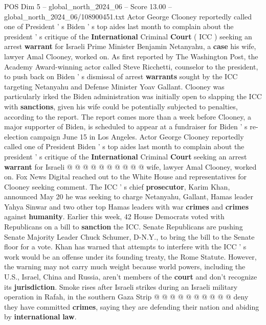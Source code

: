 \begin{textsample}{POS Dim 5 – global\_north\_2024\_06 – Score 13.00 – global\_north\_2024\_06/108900451.txt}  \label{ex:f5_pos_373}
Actor George Clooney reportedly called one of President ' s Biden ' s top aides last month to complain about the president ' s critique of the \textbf{International} Criminal \textbf{Court} ( ICC ) seeking an arrest \textbf{warrant} for Israeli Prime Minister Benjamin Netanyahu, a \textbf{case} his wife, lawyer Amal Clooney, worked on.
As first reported by The Washington Post, the Academy Award-winning actor called Steve Ricchetti, counselor to the president, to push back on Biden ' s dismissal of arrest \textbf{warrants} sought by the ICC targeting Netanyahu and Defense Minister Yoav Gallant.
Clooney was particularly irked the Biden administration was initially open to slapping the ICC with \textbf{sanctions}, given his wife could be potentially subjected to penalties, according to the report.
The report comes more than a week before Clooney, a major supporter of Biden, is scheduled to appear at a fundraiser for Biden ' s re-election campaign June 15 in Los Angeles.
Actor George Clooney reportedly called one of President Biden ' s top aides last month to complain about the president ' s critique of the \textbf{International} Criminal \textbf{Court} seeking an arrest \textbf{warrant} for Israeli @ @ @ @ @ @ @ @ @ @ wife, lawyer Amal Clooney, worked on.
Fox News Digital reached out to the White House and representatives for Clooney seeking comment.
The ICC ' s chief \textbf{prosecutor}, Karim Khan, announced May 20 he was seeking to charge Netanyahu, Gallant, Hamas leader Yahya Sinwar and two other top Hamas leaders with war \textbf{crimes} and \textbf{crimes} against \textbf{humanity}.
Earlier this week, 42 House Democrats voted with Republicans on a bill to \textbf{sanction} the ICC.
Senate Republicans are pushing Senate Majority Leader Chuck Schumer, D-N.Y., to bring the bill to the Senate floor for a vote.
Khan has warned that attempts to interfere with the ICC ' s work would be an offense under its founding treaty, the Rome Statute.
However, the warning may not carry much weight because world powers, including the U.S., Israel, China and Russia, aren't members of the \textbf{court} and don't recognize its \textbf{jurisdiction}.
Smoke rises after Israeli strikes during an Israeli military operation in Rafah, in the southern Gaza Strip @ @ @ @ @ @ @ @ @ @ deny they have committed \textbf{crimes}, saying they are defending their nation and abiding by \textbf{international} \textbf{law}.

\end{textsample}
